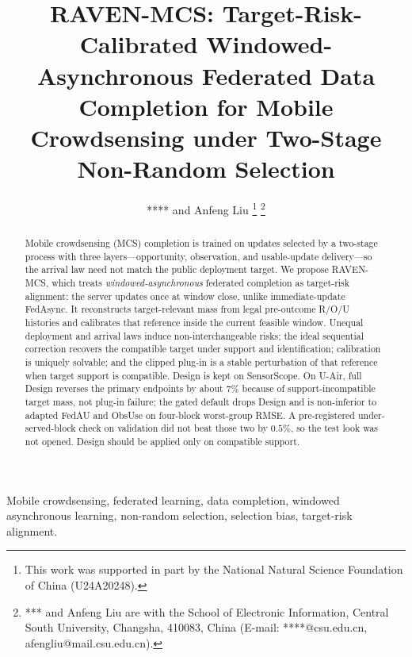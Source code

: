 \documentclass[letterpaper,journal]{IEEEtran}
\begin{document}
\title{RAVEN-MCS: Target-Risk-Calibrated Windowed-Asynchronous Federated Data Completion for Mobile Crowdsensing under Two-Stage Non-Random Selection}

\author{**** and Anfeng Liu%
\thanks{This work was supported in part by the National Natural Science Foundation of China (U24A20248).}%
\thanks{*** and Anfeng Liu are with the School of Electronic Information, Central South University, Changsha, 410083, China (E-mail: ****@csu.edu.cn, afengliu@mail.csu.edu.cn).}%
}


\maketitle





\begin{abstract}
Mobile crowdsensing (MCS) completion is trained on updates selected by a
two-stage process with three layers---opportunity, observation, and
usable-update delivery---so the arrival law need not match the public
deployment target.  We propose RAVEN-MCS, which treats
\emph{windowed-asynchronous} federated completion as target-risk alignment:
the server updates once at window close, unlike immediate-update FedAsync.
It reconstructs target-relevant mass from legal pre-outcome R/O/U histories
and calibrates that reference inside the current feasible window.
Unequal deployment and arrival laws induce non-interchangeable risks; the
ideal sequential correction recovers the compatible target under support
and identification; calibration is uniquely solvable; and the clipped
plug-in is a stable perturbation of that reference when target support is
compatible.  Design is kept on SensorScope.  On U-Air, full Design reverses
the primary endpoints by about \(7\%\) because of support-incompatible
target mass, not plug-in failure; the gated default drops Design and is
non-inferior to adapted FedAU and ObsUse on four-block worst-group RMSE.
A pre-registered under-served-block check on validation did not beat those
two by \(0.5\%\), so the test look was not opened.
Design should be applied only on compatible support.
\end{abstract}

\begin{IEEEkeywords}
Mobile crowdsensing, federated learning, data completion, windowed asynchronous learning, non-random selection, selection bias, target-risk alignment.
\end{IEEEkeywords}
\end{document}
